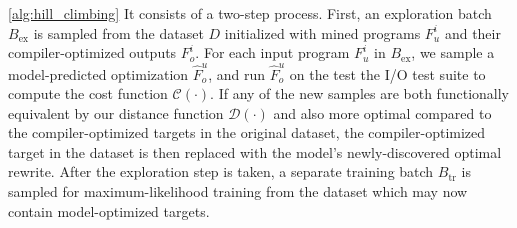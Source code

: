\documentclass{article}
\begin{document}
\cref{alg:hill_climbing} 
It consists of a two-step process. 
First, an exploration batch $B_{\mathrm{ex}}$ is sampled from the dataset $D$ initialized with mined programs $F^i_u$ and their compiler-optimized outputs $F^i_o$. 
For each input program $F^i_u$ in $B_{\mathrm{ex}}$, we sample a model-predicted optimization $\hat{F}^u_o$, and run $\hat{F}^u_o$ on the test the I/O test suite to compute the cost function $\mathcal{C}(\cdot)$.
If any of the new samples are both functionally equivalent by our distance function $\mathcal{D}(\cdot)$ and also more optimal compared to the compiler-optimized targets in the original dataset, the compiler-optimized target in the dataset is then replaced with the model's newly-discovered optimal rewrite. 
After the exploration step is taken, a separate training batch $B_{\mathrm{tr}}$ is sampled for maximum-likelihood training from the dataset which may now contain model-optimized targets. 




\end{document}
